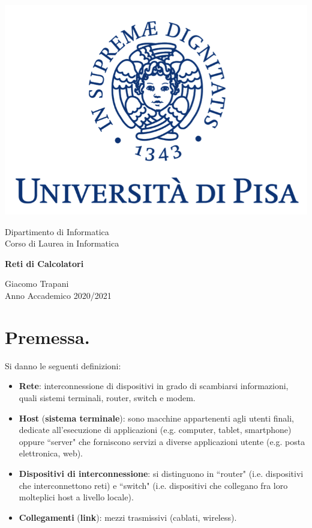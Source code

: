 \documentclass[11pt, italian, openany]{book}
\begin{document}
\begin{sloppypar}
\begin{titlepage}
	\clearpage\thispagestyle{empty}
	\centering
	\vspace{1cm}

    \includegraphics[scale=0.60]{unipi-logo.png}
    
	{\normalsize \noindent Dipartimento di Informatica \\
	             Corso di Laurea in Informatica \par}
	
	\vspace{2cm}
	{\Huge \textbf{Reti di Calcolatori} \par }

    \vspace{4cm}

	{\normalsize Giacomo Trapani \\ Anno Accademico 2020/2021\par}

	\pagebreak

\end{titlepage}
\section*{Premessa.}
Si danno le seguenti definizioni:
\begin{itemize}[topsep=0pt]
\itemsep-0.3em
	\item \textbf{Rete}: interconnessione di dispositivi in grado di scambiarsi informazioni, quali sistemi terminali, router, switch e modem.
	\item \textbf{Host} (\textbf{sistema terminale}): sono macchine appartenenti agli utenti finali, dedicate all'esecuzione di applicazioni (e.g. computer,
	tablet, smartphone) oppure ``server" che forniscono servizi a diverse applicazioni utente (e.g. posta elettronica, web).
	\item \textbf{Dispositivi di interconnessione}: si distinguono in ``router" (i.e. dispositivi che interconnettono reti) e ``switch"
	(i.e. dispositivi che collegano fra loro molteplici host a livello locale).
	\item \textbf{Collegamenti} (\textbf{link}): mezzi trasmissivi (cablati, wireless).
\end{itemize}

\end{sloppypar}
\end{document}
